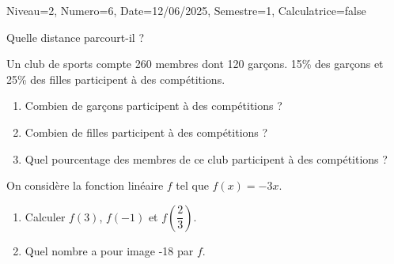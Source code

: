 \documentclass[a4paper,12pt]{article}
\begin{document}
\begin{Maquette}[DS]{Niveau=2, Numero=6, Date=12/06/2025, Semestre=1, Calculatrice=false}
\begin{exercice}[BaremeDetaille]
Quelle distance parcourt-il ?

\begin{minipage}{0.48\linewidth}
  \anserline[7]
\end{minipage}\hfill%
\begin{minipage}{0.48\linewidth}
\anserline[7]
\end{minipage}
\end{exercice}


\begin{exercice}[BaremeDetaille]
Un club de sports compte 260 membres dont 120 garçons.
15\% des garçons et 25\% des filles participent à des compétitions.
\begin{enumerate}
  \item{} Combien de garçons participent à des compétitions ?

  \anserline[3]
\item {} Combien de filles participent à des compétitions ?
  
    \anserline[3]
\item {} Quel pourcentage des membres de ce club participent à des compétitions ?

    \anserline[4]
\end{enumerate}
\end{exercice}


\begin{exercice}[BaremeDetaille]
On considère la fonction linéaire $f$ tel que $f(x)=-3x$.
\begin{enumerate}
\item{} Calculer $f(3)$, $f(-1)$ et $f(\dfrac{2}{3})$.\\
\anserline[6]
\item{} Quel nombre a pour image -18 par $f$.\\
\anserline[3]
\end{enumerate}
\end{exercice}

\end{Maquette}
\end{document}
